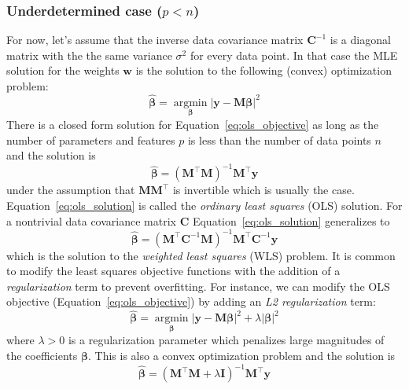 \documentclass[12pt,dvipsnames]{report}
\renewcommand{\vec}[1]{\boldsymbol{\mathbf{#1}}}
\begin{document}
\subsubsection{Underdetermined case ($p < n$)}
For now, let's assume that the inverse data covariance matrix $\vec{C}^{-1}$ is
a diagonal matrix with the the same variance $\sigma^2$ for every data point.
In that case the MLE solution for the weights $\vec{w}$ is the solution to the
following (convex) optimization problem:
\begin{equation}
    \hat{\vec\beta}=
    \underset{\vec \beta}{\operatorname{argmin}}\left|\vec{y}-\vec{M} \vec\beta\right|^{2}
    \label{eq:ols_objective}
\end{equation}
There is a closed form solution for Equation~\ref{eq:ols_objective} as long as the number
of parameters and features $p$ is less than the number of data points $n$ and the solution
is \citep{arXiv:2101.07256}
\begin{equation}
    \hat{\vec\beta}=(\vec{M}^{\intercal} \vec{M})^{-1} \vec{M}^{\intercal} \vec{y}
    \label{eq:ols_solution}
\end{equation}
under the assumption that $\vec{M}\vec{M}^\intercal$ is invertible which is usually the case.
Equation~\ref{eq:ols_solution} is called the \emph{ordinary least squares} (OLS) solution.
For a nontrivial data covariance matrix $\vec{C}$ Equation~\ref{eq:ols_solution} generalizes
to
\begin{equation}
    \hat{\vec\beta}=(\vec{M}^{\intercal}\vec{C}^{-1}\vec{M})^{-1} \vec{M}^{\intercal}\vec{C}^{-1} \vec{y}
    \label{eq:wls_solution}
\end{equation}
which is the solution to the \emph{weighted least squares} (WLS) problem.
It is common to modify the least squares objective functions with the addition of a
\emph{regularization} term to prevent overfitting. For instance, we can modify the OLS
objective (Equation~\ref{eq:ols_objective}) by adding an \emph{L2 regularization} term:
\begin{equation}
    \hat{\vec\beta}=
    \underset{\vec \beta}{\operatorname{argmin}}\left|\vec{y}-\vec{M} \vec\beta\right|^{2} + \lambda \left|\vec\beta\right|^2
    \label{eq:ols_objective_l2}
\end{equation}
where $\lambda >0$ is a regularization parameter
which penalizes large magnitudes of the coefficients $\vec\beta$. This is also a convex
optimization problem and the solution is
\begin{equation}
    \hat{\vec\beta}=(\vec{M}^{\intercal} \vec{M} + \lambda\vec{I})^{-1} \vec{M}^{\intercal} \vec{y}
    \label{eq:ols_solution_l2}
\end{equation}
\end{document}
